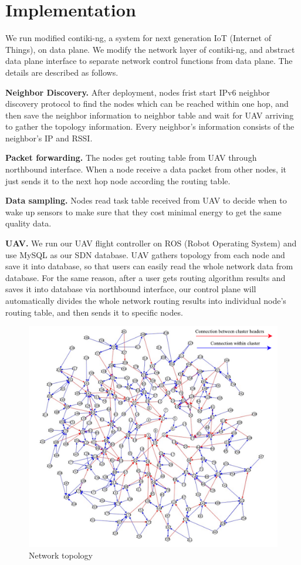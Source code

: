\section{Implementation}
\label{Imp}

We run modified contiki-ng, a system for next generation IoT (Internet of
Things), on data plane. We modify the network layer of contiki-ng, and abstract
data plane interface to separate network control functions from data plane. 
The details are described as follows.

\textbf{Neighbor Discovery.} After deployment, nodes frist start IPv6 neighbor
discovery protocol to find the nodes which can be reached within one hop, and
then save the neighbor information to neighbor table and wait for UAV arriving
to gather the topology information. Every neighbor's information consists of the
neighbor's IP and RSSI. 

\textbf{Packet forwarding.} The nodes get routing table from UAV through
northbound interface. When a node receive a data packet from other nodes, it
just sends it to the next hop node according the routing table.

\textbf{Data sampling.} Nodes read task table received from UAV to decide when
to wake up sensors to make sure that they cost minimal energy to get the same
quality data. 

\textbf{UAV.} We run our UAV flight controller on ROS (Robot Operating System)
and use MySQL as our SDN database. UAV gathers topology from each node and save
it into database, so that users can easily read the whole network data from
database. For the same reason, after a user gets routing algorithm results and
saves it into database via northbound interface, our control plane will
automatically divides the whole network routing results into individual node's
routing table, and then sends it to specific nodes.

\begin{figure}[htbp]
	\centering
	\includegraphics[width=.85\columnwidth]{Figure/topology}
	\vspace{-0.1in}
	\caption{Network topology}
	\label{topology}
	\vspace{-0.1in}
\end{figure}

